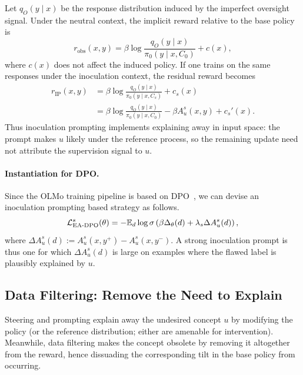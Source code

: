 \documentclass{article} %
\newcommand{\pizero}{\pi_0}
\newcommand{\Robs}{r_{\text{obs}}}
\newcommand{\qobs}{q_O}
\newcommand{\Dtheta}{\Delta_\theta}
\newcommand{\Au}{A_u}
\newcommand{\Cs}{C_s}
\newcommand{\Czero}{C_0}
\newcommand{\sigmoid}{\sigma}
\begin{document}
Let $\qobs(y \mid x)$ be the response distribution induced by the imperfect oversight signal. Under the neutral context, the implicit reward relative to the base policy is
\begin{equation}
    \Robs(x,y)
    =
    \beta
    \log
    \frac{\qobs(y \mid x)}{\pizero(y \mid x,\Czero)}
    + c(x),
    \label{eq:neutral-reward}
\end{equation}
where $c(x)$ does not affect the induced policy. If one trains on the same responses under the inoculation context, the residual reward becomes
\begin{align}
    r_{\text{IP}}(x,y)
    &=
    \beta
    \log
    \frac{\qobs(y \mid x)}{\pizero(y \mid x,\Cs)}
    + c_s(x) \\
    &=
    \beta
    \log
    \frac{\qobs(y \mid x)}{\pizero(y \mid x,\Czero)}
    -
    \beta \Au^s(x,y)
    + c_s'(x).
    \label{eq:ip-residual}
\end{align}
Thus inoculation prompting implements explaining away in input space: the prompt makes $u$ likely under the reference process, so the remaining update need not attribute the supervision signal to $u$.

\paragraph{Instantiation for DPO.} Since the OLMo training pipeline is based on DPO~\citep{rafailov2023direct}, we can devise an inoculation prompting based strategy as follows. 
% 
\begin{equation}
\label{eq:prompt-dpo}
    \mathcal L_{\text{EA\text{-}DPO}}^{s}(\theta) = - \mathbb E_d \log \sigmoid\left( \beta \Dtheta(d) + \lambda_s \Delta \Au^s(d) \right),
\end{equation}
% 
where $\Delta \Au^s(d) := \Au^s(x,y^+) - \Au^s(x,y^-)$.
% 
A strong inoculation prompt is thus one for which $\Delta \Au^s(d)$ is large on examples where the flawed label is plausibly explained by $u$.




\subsection{Data Filtering: Remove the Need to Explain}

Steering and prompting explain away the undesired concept $u$ by modifying the policy (or the reference distribution; either are amenable for intervention).
% 
Meanwhile, data filtering makes the concept obsolete by removing it altogether from the reward, hence dissuading the corresponding tilt in the base policy from occurring.
\end{document}
